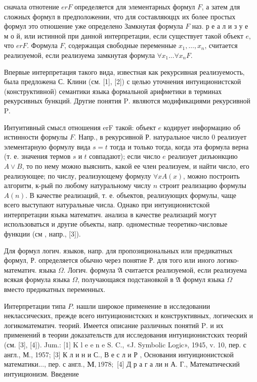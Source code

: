 \documentclass[10pt]{article}
\begin{document}
сначала отнотение $e r F$ определяется для элементарных формул $F$, а затем для сложных формул в предположении, что для составляюццх их более простых формул это отношение уже определено Замкнутая формула $F$ наз. р е а л и з у е м о й, или истинной при данной интерпретации, если существует такой объект $e$, что $e r F$. Формула $F$, содержащая свободные переменные $x_{1}, \ldots, x_{n}$, считается реализуемой, если реализуема замкнутая формула $\forall x_{1} \ldots \forall x_{n} F$.



Впервые интерпретация такого вида, известная как рекурсивная реализуемость, была предложена С. Клини (см. [1], [2]) с целью уточнения интуиционистской (конструктивной) семантики языка формальной арифметики в терминах рекурсивных бункций. Другие понятия $\mathrm{P}$. являются модификациями рекурсивной $\mathrm{P}$.



Интуитивный смысл отношения erF такой: объект $e$ кодирует информацию об истинности формулы $F$. Напр., в рекурсивной Р. натуральное число 0 реализует элементарную формулу вида $s=t$ тогда и только тогда, когда эта формула верна (т. е. значения термов $s$ и $t$ совпадают); если число $e$ реализует дизъюнкцию $A \vee B$, то по нему можно выяснить, какой ее член реализуем, и найти число, его реализующее; по числу, реализующему формулу $\forall x A(x)$, можно построить алгоритм, к-рый по любому натуральному числу $n$ строит реализацию формулы $A(n)$. В качестве реализаций, т. е. объектов, реализующих формулы, чаще всего выступают натуральные числа. Однако при интуиционистской интерпретации языка математич. анализа в качестве реализаций могут использоваться и другие объекты, напр. одноместные теоретико-числовые функции (см , напр., [3]).



Для формул логич. языков, напр. для пропозициональных или предикатных формул, Р. определяется обычно через понятие Р. для того или иного логико-математич. языка $\Omega$. Логич. формула $\mathfrak{A}$ считается реализуемой, если реализуема всякая формула языка $\Omega$, получающаяся подстановкой в $\mathfrak{A}$ формул языка $\Omega$ вместо предикатных переменных.



Интерпретации типа $P$. нашли широкое применение в исследовании неклассических, прежде всего интуиционистских и конструктивных, логических и логикоматематич. теорий. Имеется описание различных понятий $\mathrm{P}$. и их применений в теории доказательств для исследования интуиционистских теорий (см. [3], [4]). Jum.: [1] K l e e n e S. C., «J. Symbolic Logic», 1945, v. 10, пер. с англ., М., 1957; [3] К л и н и С., В е с л и Р , Основания интуиционистской математики..., пер. с англ., $\mathbf{M}, 1978 ;$ [4] Д р а г а ли н А. Г., Математический интуиционизм. Введение
\end{document}
